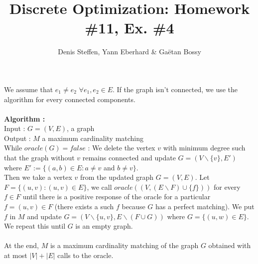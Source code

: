 \documentclass[a4paper,11pt,french]{article}
\title{Discrete Optimization: Homework \#11, Ex. \#4}
\author{Denis Steffen, Yann Eberhard \& Gaëtan Bossy}
\begin{document}
    
    \maketitle

    We assume that $ e_1 \neq  e_2$  $\forall e_1,e_2\in E$.  If the graph isn't connected, we use the algorithm for every connected components.\\\\
    
    
    \textbf{Algorithm :} \\
    Input : $G=(V,E)$, a graph \\
     Output : $M$ a maximum cardinality matching\\
    
    
    
    While $oracle(G)=false$ : We delete the vertex $v$ with minimum degree such that the graph without $v$ remains connected and update $G=(V\backslash{\{v\}},E')$ where $E' := \{(a,b) \in E : a\neq  v$ and $b \neq v \}$.\\
    
    
   Then we take a vertex $v$ from the updated graph $G=(V,E)$. Let $F=\{(u,v) : (u,v) \in E\}$, we call $oracle( (V,(E\backslash F ) \cup \{f\}))$ for every $f \in F$ until there is a positive response of the oracle for a particular $f=(u,v) \in F$ (there exists a such $f$ because $G$ has a perfect matching). We put $f$ in $M$ and update $G=(V\backslash \{u,v\},E\backslash (F \cup G))$ where $G=\{(u,w) \in E\}$. \\
   We repeat this until $G$ is an empty graph. \\\\ 
 
At the end, $M$ is a maximum cardinality matching of the graph $G$ obtained with at most $|V|+|E|$ calls to the oracle.
  
\end{document}
